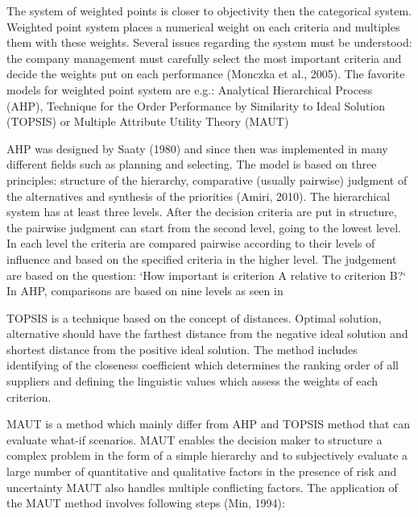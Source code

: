 \documentclass[oneside,12pt]{article}%
\begin{document}
The system of weighted points is closer to objectivity then the categorical system. Weighted point system places a numerical weight on each criteria and multiples them with these weights. Several issues regarding the system must be understood: the company management must carefully select the most important criteria and decide the weights put on each performance (Monczka et al., 2005). The favorite models for weighted point system are e.g.: Analytical Hierarchical Process (AHP), Technique for the Order Performance by Similarity to Ideal Solution (TOPSIS) or Multiple Attribute Utility Theory (MAUT) \par
AHP was designed by Saaty (1980) and since then was implemented in many different fields such as planning and selecting. The model is based on three principles: structure of the hierarchy, comparative (usually pairwise) judgment of the alternatives and synthesis of the priorities (Amiri, 2010). The hierarchical system has at least three levels. After the decision criteria are put in structure, the pairwise judgment can start from the second level, going to the lowest level. In each level the criteria are compared pairwise according to their levels of influence and based on the specified criteria in the higher level. The judgement are based on the question: ‘How important is criterion A relative to criterion B?‘ In AHP, comparisons are based on nine levels as seen in \par
TOPSIS is a technique based on the concept of distances. Optimal solution, alternative should have the farthest distance from the negative ideal solution and shortest distance from the positive ideal solution. The method includes identifying of the closeness coefficient which determines the ranking order of all suppliers and defining the linguistic values which assess the weights of each criterion. \par
MAUT is a method which mainly differ from AHP and TOPSIS method that can evaluate what-if scenarios. MAUT enables the decision maker to structure a complex problem in the form of a simple hierarchy and to subjectively evaluate a large number of quantitative and qualitative factors in the presence of risk and uncertainty MAUT also handles multiple conflicting factors. The application of the MAUT method involves following steps (Min, 1994):
\end{document}
